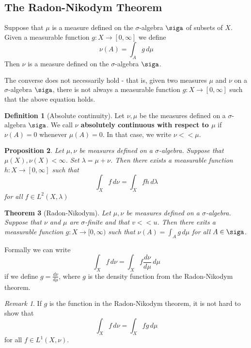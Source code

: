 \documentclass[10pt, oneside, reqno]{amsart}
\theoremstyle{plain}%
\newtheorem{thm}{Theorem}[section]
\newtheorem{prop}[thm]{Proposition}
\theoremstyle{definition}
\newtheorem{defn}[thm]{Definition}
\theoremstyle{remark}
\newtheorem*{rem}{Remark}
\newcommand{\dmu}{\, d \mu}
\begin{document}
\subsection{The Radon-Nikodym Theorem} %
\label{sub:the_radon_nikodym_theorem}
 Suppose that $\mu$ is a measure defined on the $\sigma$-algebra $\siga$ of subsets of $X.$  Given a measurable function $g : X \rightarrow [0,\infty]$ we define \[
    \nu(A) = \int_A g \dmu
 \]
Then $\nu$ is a measure defined on the $\sigma$-algebra $\siga$.

The converse does not necessarily hold - that is, given two measures $\mu$ and $\nu$ on a $\sigma$-algebra $\siga$, there is not always a measurable function $g : X \rightarrow [0,\infty]$ such that the above equation holds.

\begin{defn}[Absolute continuity]
    Let $\nu, \mu$ be the measures defined on a $\sigma$-algebra $\siga$. We call \textbf{$\nu$ absolutely continuous with respect to $\mu$} if $\nu(A) = 0$ whenever $\mu(A) = 0$.  In that case, we write $\nu << \mu$.
\end{defn}

\begin{prop}
    Let $\mu, \nu$ be measures defined on a $\sigma$-algebra.  Suppose that $\mu(X), \nu(X) < \infty$.  Set $\lambda = \mu + \nu$.  Then there exists a measurable function $h : X \rightarrow [0,\infty] $ such that \[
        \int_X f \, d \nu = \int_X f h \, d \lambda
    \] for all $f \in L^2(X, \lambda)$
\end{prop}

\begin{thm}[Radon-Nikodym]
    Let $\mu,\nu$ be measures defined on a $\sigma$-algebra.  Suppose that $\nu$ and $\mu$ are $\sigma$-finite and that $v << u$.  Then there exits a measurable function $g : X \rightarrow [0,\infty)$ such that $\nu(A) = \int_A g \dmu$ for all $A \in \siga$. 
\end{thm}

Formally we can write \[
    \int_X f \, d \nu = \int_X f \frac{d \nu}{d\mu} \dmu
\] if we define $g = \frac{d \nu}{d\mu}$, where $g$ is the density function from the Radon-Nikodym theorem.

\begin{rem}
    If $g$ is the function in the Radon-Nikodym theorem, it is not hard to show that \[
        \int_X f \, d \nu = \int_X f g \dmu
    \] for all $f \in L^1(X, \nu)$.
\end{rem}
\end{document}
